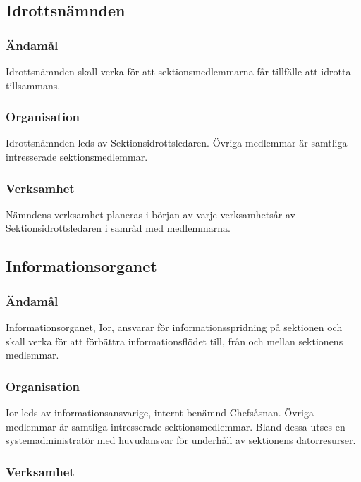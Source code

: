 \documentclass{dgovdoc}
\begin{document}
\subsection{Idrottsnämnden}

\subsubsection{Ändamål}

Idrottsnämnden skall verka för att sektionsmedlemmarna får tillfälle att idrotta tillsammans.

\subsubsection{Organisation}

Idrottsnämnden leds av Sektionsidrottsledaren. Övriga medlemmar är samtliga intresserade sektionsmedlemmar.

\subsubsection{Verksamhet}

Nämndens verksamhet planeras i början av varje verksamhetsår av Sektionsidrottsledaren i samråd med medlemmarna.

\subsection{Informationsorganet}

\subsubsection{Ändamål}

Informationsorganet, Ior, ansvarar för informationsspridning på sektionen och skall verka för att förbättra informationsflödet till, från och mellan sektionens medlemmar.

\subsubsection{Organisation}

Ior leds av informationsansvarige, internt benämnd Chefsåsnan. Övriga medlemmar är samtliga intresserade sektionsmedlemmar. Bland dessa utses en systemadministratör med huvudansvar för underhåll av sektionens datorresurser.

\subsubsection{Verksamhet}
\end{document}
